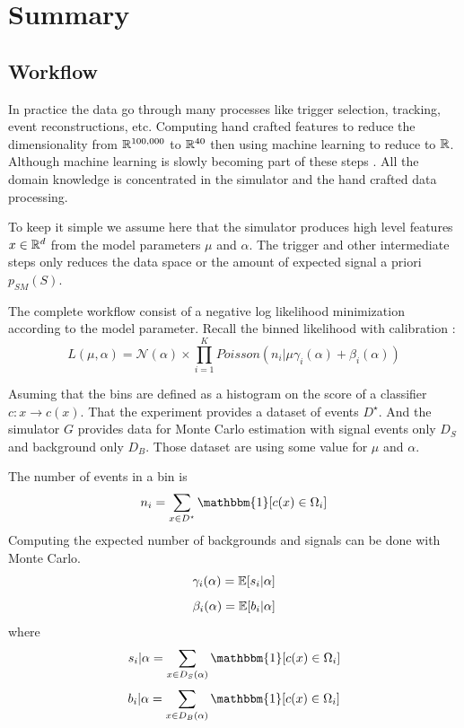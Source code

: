 \section{Summary} %
\label{sec:summary}


\subsection{Workflow} %
\label{sub:workflow}


In practice the data go through many processes like trigger selection, tracking, event reconstructions, etc.
Computing hand crafted features to reduce the dimensionality from $\mathbb{R}^{100,000}$ to $\mathbb{R}^{40}$ then using machine learning to reduce to $\mathbb{R}$.
Although machine learning is slowly becoming part of these steps \needcite.
All the domain knowledge is concentrated in the simulator and the hand crafted data processing.

To keep it simple we assume here that the simulator produces high level features $x \in \mathbb{R}^d$ from the model parameters $\mu$ and $\alpha$.
The trigger and other intermediate steps only reduces the data space or the amount of expected signal a priori $p_{SM}(S)$.

The complete workflow consist of a negative log likelihood minimization according to the model parameter.
Recall the binned likelihood with calibration :
\begin{equation}
  L(\mu, \alpha) =\mathcal N (\alpha) \times \prod_{i=1}^K Poisson(n_i | \mu \gamma_i(\alpha) + \beta_i(\alpha) )
\end{equation}

Asuming that the bins are defined as a histogram on the score of a classifier $c : x \to c(x)$.
That the experiment provides a dataset of events $D^\star$.
And the simulator $G$ provides data for Monte Carlo estimation with signal events only $D_S$ and background only $D_B$.
Those dataset are using some value for $\mu$ and $\alpha$.

The number of events in a bin is 
\begin{equation}
  n_i = \sum_{x \in D^\star} \mathbbm{1} [c(x)\in \Omega_i]
\end{equation}
Computing the expected number of backgrounds and signals can be done with Monte Carlo.
\begin{equation}
  \gamma_i(\alpha) = \mathbb{E}[s_i|\alpha]
\end{equation}
\begin{equation}
  \beta_i(\alpha) = \mathbb{E}[b_i|\alpha]
\end{equation}
where 
\begin{equation}
  s_i | \alpha = \sum_{x \in D_S(\alpha)} \mathbbm{1} [c(x)\in \Omega_i]
\end{equation}
\begin{equation}
  b_i | \alpha = \sum_{x \in D_B(\alpha)} \mathbbm{1} [c(x)\in \Omega_i]
\end{equation}

